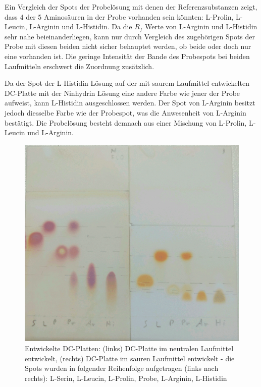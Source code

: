 \documentclass{article}
\begin{document}
      Ein Vergleich der Spots der Probelösung mit denen der Referenzsubstanzen zeigt, dass 4 der 5 Aminosäuren in der Probe vorhanden sein könnten: L-Prolin, L-Leucin, L-Arginin und L-Histidin. Da die $R_{f}$ Werte von L-Arginin und L-Histidin sehr nahe beieinanderliegen, kann nur durch Vergleich des zugehörigen Spots der Probe mit diesen beiden nicht sicher behauptet werden, ob beide oder doch nur eine vorhanden ist. Die geringe Intensität der Bande des Probespots bei beiden Laufmitteln erschwert die Zuordnung zusätzlich. 
      
      Da der Spot der L-Histidin Lösung auf der mit saurem Laufmittel entwickelten DC-Platte mit der Ninhydrin Lösung eine andere Farbe wie jener der Probe aufweist, kann L-Histidin ausgeschlossen werden. Der Spot von L-Arginin besitzt jedoch diesselbe Farbe wie der Probespot, was die Anwesenheit von L-Arginin bestätigt. Die Probelösung besteht demnach aus einer Mischung von L-Prolin, L-Leucin und L-Arginin.
      
      \begin{figure}[H]
        \includegraphics[scale=0.4, center]{Graphiken/Versuchsanordnungen/AusgewerteteDCPlatten.png} 
        \caption[Entwickelte DC-Platten inkl. Beschriftung, Quelle: Autor]{Entwickelte DC-Platten: (links) DC-Platte im neutralen Laufmittel entwickelt, (rechts) DC-Platte im sauren Laufmittel entwickelt - die Spots wurden in folgender Reihenfolge aufgetragen (links nach rechts): L-Serin, L-Leucin, L-Prolin, Probe, L-Arginin, L-Histidin}
        \label{fig:DCPlatten}
      \end{figure}
        
\end{document}
